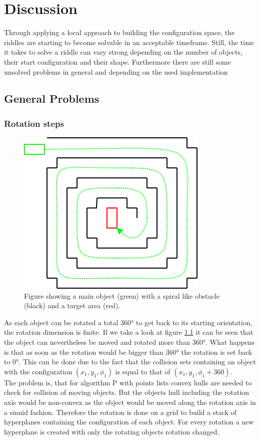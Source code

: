 \chapter{Discussion}
Through applying a local approach to building the configuration space, the riddles are starting to become solvable in an acceptable timeframe.
Still, the time it takes to solve a riddle can vary strong depending on the number of objects, their start configuration and their shape. Furthermore there are still some unsolved problems in general and depending on the used implementation

\section{General Problems}
\subsection{Rotation steps}
\begin{figure}[H]
\centering
\includegraphics[scale=0.5]{endlessRot}
\caption{Figure showing a main object (green) with a spiral like obstacle (black) and a target area (red).}
\label{rotFigure}
\end{figure}
As each object can be rotated a total 360° to get back to its starting orientation, the rotation dimension is finite. If we take a look at figure \ref{rotFigure} it can be seen that the object can nevertheless be moved and rotated more than 360°. What happens is that as soon as the rotation would be bigger than 360° the rotation is set back to 0°. This can be done due to the fact that the collision sets containing an object with the configuration $(x_1 , y_1, \phi_1)$ is equal to that of $(x_1, y_1, \phi_1 + 360)$.\\
The problem is, that for algorithm P with points lists convex hulls are needed to check for collision of moving objects. But the objects hull including the rotation axis would be non-convex as the object would be moved along the rotation axis in a sinuid fashion. Therefore the rotation is done on a grid to build a stack of hyperplanes containing the configuration of each object. For every rotation a new hyperplane is created with only the rotating objects rotation changed.\\
